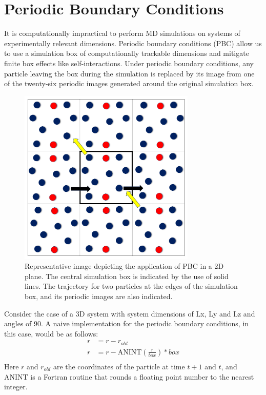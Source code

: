 \section{Periodic Boundary Conditions}
It is computationally impractical to perform MD simulations on systems of experimentally relevant dimensions. Periodic boundary conditions (PBC) allow us to use a simulation box of computationally trackable dimensions and mitigate finite box effects like self-interactions. Under periodic boundary conditions, any particle leaving the box during the simulation is replaced by its image from one of the twenty-six periodic images generated around the original simulation box. 
\begin{figure}
    \centering
    \includegraphics[width=0.75\textwidth]{Methods/Figures/pbc.png}
    \caption[Representative image depicting the application of PBC in a 2D plane]{Representative image depicting the application of PBC in a 2D plane. The central simulation box is indicated by the use of solid lines. The trajectory for two particles at the edges of the simulation box, and its periodic images are also indicated.}
\end{figure}

Consider the case of a 3D system with system dimensions of Lx, Ly and Lz and angles of 90. A naive implementation for the periodic boundary conditions, in this case, would be as follows:
\begin{align*}
    r &= r - r_{old}        \\           
    r &= r - \text{ANINT}( \frac{r}{box}) * box \\
\end{align*}
Here $r$ and $r_{old}$ are the coordinates of the particle at time $t+1$ and $t$, and ANINT is a Fortran routine that rounds a floating point number to the nearest integer.
